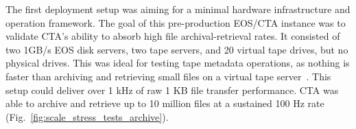 \documentclass{webofc}
\begin{document}
The first deployment setup was aiming for a minimal hardware infrastructure and operation framework. The goal of this
pre-production EOS/CTA instance was to validate CTA's ability to absorb high file archival-retrieval rates. It
consisted of two 1GB/s EOS disk servers, two tape servers, and 20 virtual tape drives, but no physical drives. This was ideal for testing
tape metadata operations, as nothing is faster than archiving and retrieving small files on a virtual tape server~\cite{mhvtl}.
This setup could deliver over 1 kHz of raw 1 KB file transfer performance. CTA was able to archive and retrieve up
to 10 million files at a sustained 100 Hz rate (Fig.~\ref{fig:scale_stress_tests_archive}).

\begin{figure}[t]
   \vspace{-1cm}
   \centering
\end{figure}
\end{document}
